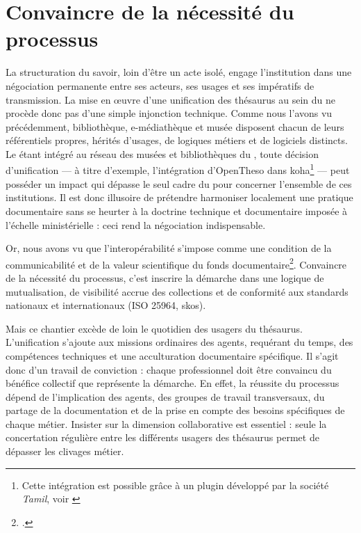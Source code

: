 \section{\label{III-B-1}Convaincre de la nécessité du processus}

La structuration du savoir, loin d’être un acte isolé, engage l’institution dans une négociation permanente entre ses acteurs, ses usages et ses impératifs de transmission. La mise en œuvre d’une unification des thésaurus au sein du \mae ne procède donc pas d’une simple injonction technique. Comme nous l'avons vu précédemment, bibliothèque, e-médiathèque et musée disposent chacun de leurs référentiels propres, hérités d’usages, de logiques métiers et de logiciels distincts. Le \mae étant intégré au réseau des musées et bibliothèques du \minarm, toute décision d’unification --- à titre d’exemple, l’intégration d’OpenTheso dans \gls{koha}\footnote{Cette intégration est possible grâce à un plugin développé par la société \textit{Tamil}, voir \cite{PluginTamilOpentheso}} --- peut posséder un impact qui dépasse le seul cadre du \mae pour concerner l'ensemble de ces institutions. Il est donc illusoire de prétendre harmoniser localement une pratique documentaire sans se heurter à la doctrine technique et documentaire imposée à l’échelle ministérielle : ceci rend la négociation indispensable.

Or, nous avons vu que l’interopérabilité s’impose comme une condition de la communicabilité et de la valeur scientifique du fonds documentaire\footcite{hudonISO25964Pour2012a, maroyeISO25964Distinction2015}. Convaincre de la nécessité du processus, c’est inscrire la démarche dans une logique de mutualisation, de visibilité accrue des collections et de conformité aux standards nationaux et internationaux (ISO 25964, \ac{skos}).

Mais ce chantier excède de loin le quotidien des usagers du thésaurus. L’unification s’ajoute aux missions ordinaires des agents, requérant du temps, des compétences techniques et une acculturation documentaire spécifique. Il s’agit donc d’un travail de conviction : chaque professionnel doit être convaincu du bénéfice collectif que représente la démarche. En effet, la réussite du processus dépend de l’implication des agents, des groupes de travail transversaux, du partage de la documentation et de la prise en compte des besoins spécifiques de chaque métier. Insister sur la dimension collaborative est essentiel : seule la concertation régulière entre les différents usagers des thésaurus permet de dépasser les clivages métier.
